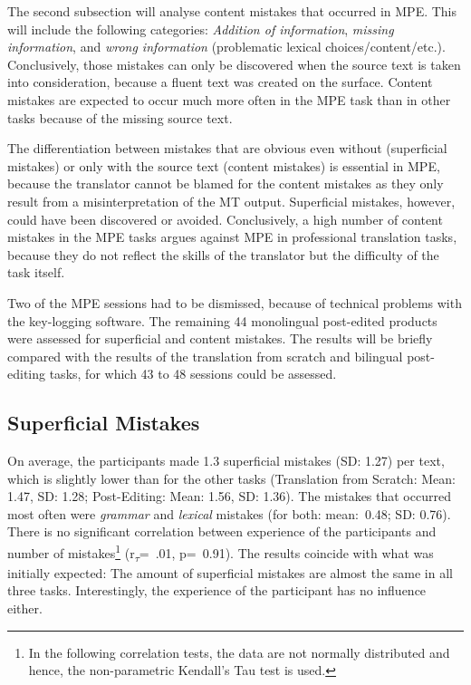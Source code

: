 \documentclass[output=paper]{langsci/langscibook}
\begin{document}
The second subsection will analyse content mistakes that occurred in MPE. This will include the following categories: \textit{Addition of information}, \textit{missing information}, and \textit{wrong information} (problematic lexical choices/content/etc.). Conclusively, those mistakes can only be discovered when the source text is taken into consideration, because a fluent text was created on the surface. Content mistakes are expected to occur much more often in the MPE task than in other tasks because of the missing source text.



The differentiation between mistakes that are obvious even without (superficial mistakes) or only with the source text (content mistakes) is essential in MPE, because the translator cannot be blamed for the content mistakes as they only result from a misinterpretation of the MT output. Superficial mistakes, however, could have been discovered or avoided. Conclusively, a high number of content mistakes in the MPE tasks argues against MPE in professional translation tasks, because they do not reflect the skills of the translator but the difficulty of the task itself.



Two of the MPE sessions had to be dismissed, because of technical problems with the key-logging software. The remaining 44 monolingual post-edited products were assessed for superficial and content mistakes. The results will be briefly compared with the results of the translation from scratch and bilingual post-editing tasks, for which 43 to 48 sessions could be assessed.


\subsection{Superficial Mistakes}

On average, the participants made 1.3 superficial mistakes (SD: 1.27) per text, which is slightly lower than for the other tasks (Translation from Scratch: Mean: 1.47, SD: 1.28; Post-Editing: Mean: 1.56, SD: 1.36). The mistakes that occurred most often were \textit{grammar} and \textit{lexical} mistakes (for both: mean:~0.48; SD: 0.76). There is no significant correlation between experience of the participants and number of mistakes\footnote{In the following correlation tests, the data are not normally distributed and hence, the non-parametric Kendall's Tau test is used.} (r\textsubscript{$\tau $}=~.01, p=~0.91). The results coincide with what was initially expected: The amount of superficial mistakes are almost the same in all three tasks. Interestingly, the experience of the participant has no influence either.
\end{document}
